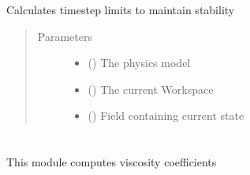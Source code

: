 \documentclass[letterpaper,10pt,english]{sphinxmanual}
\begin{document}
\begin{fulllineitems}
\label{\detokenize{autoapi/stability_fast/index:stability_fast.stability}}
\sphinxAtStartPar
Calculates timestep limits to maintain stability
\begin{quote}\begin{description}
\item[{Parameters}] \leavevmode\begin{itemize}
\item {} 
\sphinxAtStartPar
{} ({\hyperref[\detokenize{autoapi/Model/index:Model.Model}]{}}) \textendash{} The physics model

\item {} 
\sphinxAtStartPar
{} ({\hyperref[\detokenize{autoapi/Workspace/index:Workspace.Workspace}]{}}) \textendash{} The current Workspace

\item {} 
\sphinxAtStartPar
{} ({\hyperref[\detokenize{autoapi/Field/index:Field.Field}]{}}) \textendash{} Field containing current state

\end{itemize}

\end{description}\end{quote}

\end{fulllineitems}



\section{}
\label{\detokenize{autoapi/Viscosity/index:module-Viscosity}}\label{\detokenize{autoapi/Viscosity/index:viscosity}}\label{\detokenize{autoapi/Viscosity/index::doc}}
\sphinxAtStartPar
This module computes viscosity coefficients
\end{document}
